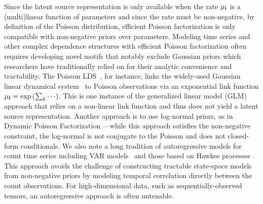 \documentclass{article}
\begin{document}
Since the latent source representation is only available when the rate $\mu_{\textbf{\textrm{i}}}$ is a (multi)linear function of parameters and since the rate must be non-negative, by definition of the Poisson distribution, efficient Poisson factorization is only compatible with non-negative priors over parameters. Modeling time series and other complex dependence structures with efficient Poisson factorization often requires developing novel motifs that notably exclude Gaussian priors which researchers have traditionally relied on for their analytic convenience and tractability. The Poisson LDS~\cite{smith2003estimating, paninski2010new, macke2011empirical}, for instance, links the widely-used Gaussian linear dynamical system~\cite{kalman1961new,ghahramani1999learning} to  Poisson observations via an exponential link function $\mu_{\textbf{\textrm{i}}} = \exp\left({\sum_k \cdots}\right)$. This is one instance of the generalized linear model (GLM) \cite{nelder1972generalized} approach that relies on a non-linear link function and thus does not yield a latent source representation. Another approach is to use log-normal priors, as in Dynamic Poisson Factorization \cite{charlin2015dynamic}---while this approach satisfies the non-negative constraint, the log-normal is not conjugate to the Poisson and does not closed-form conditionals. We also note a long tradition of autoregressive models for count time series including VAR models~\cite{brandt2012bayesian} and those based on Hawkes processes \cite{hawkes1971spectra,blundell2012modelling,simma2012modeling,linderman2014discovering}. This approach avoids the challenge of constructing tractable state-space models from non-negative priors by modeling temporal correlation directly between the count observations. For high-dimensional data, such as sequentially-observed tensors, an autoregressive approach is often untenable.~ 



\end{document}
